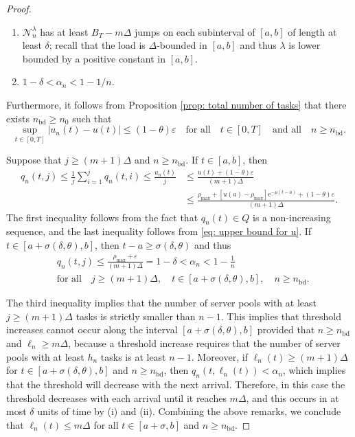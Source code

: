 \documentclass[a4paper, 12pt]{article}
\theoremstyle{definition}
\newcommand{\calN}{\mathcal{N}}
\newcommand{\bd}{\mathrm{bd}}
\newcommand{\e}{\mathrm{e}}
\begin{document}
\begin{proof}
\begin{enumerate}
	\item[(ii)] $\calN_n^\lambda$ has at least $B_T - m \Delta$ jumps on each subinterval of $[a, b]$ of length at least $\delta$; recall that the load is $\Delta$-bounded in $[a, b]$ and thus $\lambda$ is lower bounded by a positive constant in $[a, b]$.
	
	\item[(iii)] $1 - \delta < \alpha_n < 1 - 1 / n$.
\end{enumerate}
Furthermore, it follows from Proposition \ref{prop: total number of tasks} that there exists $n_\bd \geq n_0$ such that
\begin{equation*}
	\sup_{t \in [0, T]} \left|u_n(t) - u(t)\right| \leq (1 - \theta)\varepsilon \quad \text{for all} \quad t \in [0, T] \quad \text{and all} \quad n \geq n_\bd.
\end{equation*}

Suppose that $j \geq (m + 1) \Delta$ and $n \geq n_\bd$. If $t \in [a, b]$, then
\begin{align*}
	q_n(t, j) \leq \frac{1}{j} \sum_{i = 1}^j q_n(t, i) \leq \frac{u_n(t)}{j} &\leq \frac{u(t) + (1 - \theta)\varepsilon}{(m + 1) \Delta} \\ 
	&\leq \frac{\rho_{\max} + \left[u(a) - \rho_{\max}\right]\e^{-\mu(t - a)} + (1 - \theta)\varepsilon}{(m + 1) \Delta}.
\end{align*}
The first inequality follows from the fact that $q_n(t) \in Q$ is a non-increasing sequence, and the last inequality follows from \eqref{eq: upper bound for u}. If $t \in [a + \sigma(\delta, \theta), b]$, then $t - a \geq \sigma(\delta, \theta)$ and thus
\begin{align*}
	&q_n(t, j) \leq \frac{\rho_{\max} + \varepsilon}{(m + 1) \Delta} = 1 - \delta < \alpha_n < 1 - \frac{1}{n} \\
	&\text{for all} \quad j \geq (m + 1) \Delta, \quad t \in [a + \sigma(\delta, \theta), b], \quad n \geq n_\bd.
\end{align*}

The third inequality implies that the number of server pools with at least $j \geq (m + 1)\Delta$ tasks is strictly smaller than $n - 1$. This implies that threshold increases cannot occur along the interval $[a + \sigma(\delta, \theta), b]$ provided that $n \geq n_{\bd}$ and $\ell_n \geq m\Delta$, because a threshold increase requires that the number of server pools with at least $h_n$ tasks is at least $n - 1$. Moreover, if $\ell_n(t) \geq (m + 1) \Delta$ for $t \in [a + \sigma(\delta, \theta), b]$ and $n \geq n_{\bd}$, then $q_n(t, \ell_n(t)) <\alpha_n$, which implies that the threshold will decrease with the next arrival. Therefore, in this case the threshold decreases with each arrival until it reaches $m \Delta$, and this occurs in at most $\delta$ units of time by (i) and (ii). Combining the above remarks, we conclude that $\ell_n(t) \leq m\Delta$ for all $t \in [a + \sigma , b]$ and $n \geq n_{\bd}$.
%
\end{proof}
\end{document}
